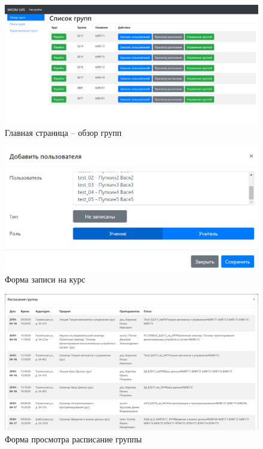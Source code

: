 \documentclass[a4paper,14pt]{article}
\begin{document}
\begin{figure}[H]
	\centering
	\includegraphics[width=\linewidth]{image/ui_listOfGroups}
	\caption{Главная страница -- обзор групп}
	\label{img:ui_listOfGroups}
\end{figure}

\begin{figure}[H]
	\centering
	\includegraphics[width=\linewidth]{image/ui_enroll}
	\caption{Форма записи на курс}
	\label{img:ui_enroll}
\end{figure}
\begin{figure}[H]
	\centering
	\includegraphics[width=\linewidth]{image/ui_scheduler}
	\caption{Форма просмотра расписание группы}
	\label{img:ui_scheduler}
\end{figure}
\end{document}
